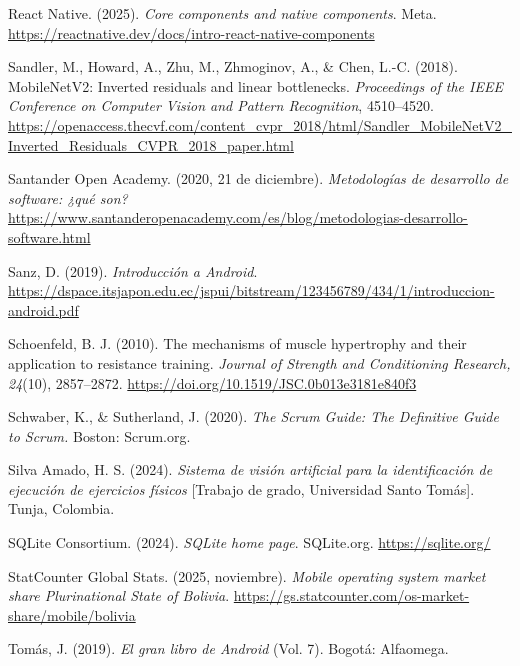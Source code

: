 \begin{referenciasapa}
\item React Native. (2025). \textit{Core components and native components}. Meta. \url{https://reactnative.dev/docs/intro-react-native-components}

\item Sandler, M., Howard, A., Zhu, M., Zhmoginov, A., \& Chen, L.-C. (2018). MobileNetV2: Inverted residuals and linear bottlenecks. \textit{Proceedings of the IEEE Conference on Computer Vision and Pattern Recognition}, 4510--4520. \url{https://openaccess.thecvf.com/content_cvpr_2018/html/Sandler_MobileNetV2_Inverted_Residuals_CVPR_2018_paper.html}

\item Santander Open Academy. (2020, 21 de diciembre). \textit{Metodologías de desarrollo de software: ¿qué son?} \url{https://www.santanderopenacademy.com/es/blog/metodologias-desarrollo-software.html}

\item Sanz, D. (2019). \textit{Introducción a Android}. \url{https://dspace.itsjapon.edu.ec/jspui/bitstream/123456789/434/1/introduccion-android.pdf}

\item Schoenfeld, B. J. (2010). The mechanisms of muscle hypertrophy and their application to resistance training. \textit{Journal of Strength and Conditioning Research, 24}(10), 2857--2872. \url{https://doi.org/10.1519/JSC.0b013e3181e840f3}

\item Schwaber, K., \& Sutherland, J. (2020). \textit{The Scrum Guide: The Definitive Guide to Scrum.} Boston: Scrum.org.

\item Silva Amado, H. S. (2024). \textit{Sistema de visión artificial para la identificación de ejecución de ejercicios físicos} [Trabajo de grado, Universidad Santo Tomás]. Tunja, Colombia.

\item SQLite Consortium. (2024). \textit{SQLite home page}. SQLite.org. \url{https://sqlite.org/}

\item StatCounter Global Stats. (2025, noviembre). \textit{Mobile operating system market share Plurinational State of Bolivia}. \url{https://gs.statcounter.com/os-market-share/mobile/bolivia}

\item Tomás, J. (2019). \textit{El gran libro de Android} (Vol. 7). Bogotá: Alfaomega.


\end{referenciasapa}

